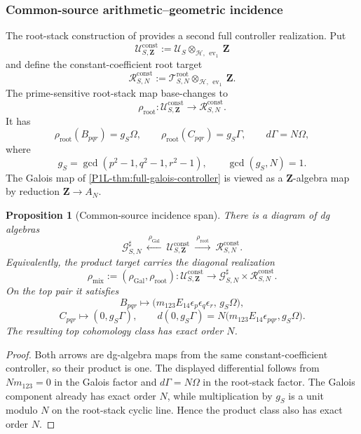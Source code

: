 \documentclass[11pt]{article}
\newtheorem{proposition}[theorem]{Proposition}
\theoremstyle{remark}
\newcommand{\Z}{\mathbf Z}
\begin{document}
\subsubsection{Common-source arithmetic--geometric incidence}\label{P1L-sec:common-source-incidence}

The root-stack construction of  provides a second full controller realization.  Put
\[
 \mathscr U^{\mathrm{const}}_{S,\Z}
 :=\mathscr U_S\otimes_{\mathcal H,\,\operatorname{ev}_1}\Z
\]
and define the constant-coefficient root target
\[
 \boxed{
 \mathscr R^{\mathrm{const}}_{S,N}
 :=
 \mathscr T^{\mathrm{root}}_{S,N}
 \otimes_{\mathcal H,\,\operatorname{ev}_1}\Z.}
\]
The prime-sensitive root-stack map base-changes to
\[
 \rho_{\mathrm{root}}:
 \mathscr U^{\mathrm{const}}_{S,\Z}
 \longrightarrow
 \mathscr R^{\mathrm{const}}_{S,N}.
\]  It has
\[
 \rho_{\mathrm{root}}(B_{pqr})=g_S\Omega,
 \qquad
 \rho_{\mathrm{root}}(C_{pqr})=g_S\Gamma,
 \qquad
 d\Gamma=N\Omega,
\]
where
\[
 g_S=\gcd(p^2-1,q^2-1,r^2-1),\qquad \gcd(g_S,N)=1.
\]
The Galois map of \cref{P1L-thm:full-galois-controller} is viewed as a $\Z$-algebra map by reduction $\Z\to A_N$.

\begin{proposition}[Common-source incidence span]\label{P1L-thm:common-source-full-incidence}
There is a diagram of dg algebras
\[
 \boxed{
 \mathscr G^{\sharp}_{S,N}
 \ \xleftarrow{\ \rho_{\mathrm{Gal}}\ }\ 
 \mathscr U^{\mathrm{const}}_{S,\Z}
 \ \xrightarrow{\ \rho_{\mathrm{root}}\ }\ 
 \mathscr R^{\mathrm{const}}_{S,N}.}
\]
Equivalently, the product target carries the diagonal realization
\[
 \rho_{\mathrm{mix}}
 :=(\rho_{\mathrm{Gal}},\rho_{\mathrm{root}}):
 \mathscr U^{\mathrm{const}}_{S,\Z}
 \longrightarrow
 \mathscr G^{\sharp}_{S,N}\times\mathscr R^{\mathrm{const}}_{S,N}.
\]
On the top pair it satisfies
\[
 \boxed{
 B_{pqr}\longmapsto
 \bigl(m_{123}E_{14}\epsilon_p\epsilon_q\epsilon_r,\,g_S\Omega\bigr),}
\]
\[
 \boxed{
 C_{pqr}\longmapsto(0,g_S\Gamma),
 \qquad
 d(0,g_S\Gamma)
 =N\bigl(m_{123}E_{14}\epsilon_{pqr},g_S\Omega\bigr).}
\]
The resulting top cohomology class has exact order $N$.
\end{proposition}

\begin{proof}
Both arrows are dg-algebra maps from the same constant-coefficient controller, so their product is one.  The displayed differential follows from $Nm_{123}=0$ in the Galois factor and $d\Gamma=N\Omega$ in the root-stack factor.  The Galois component already has exact order $N$, while multiplication by $g_S$ is a unit modulo $N$ on the root-stack cyclic line.  Hence the product class also has exact order $N$.
\end{proof}
\end{document}
